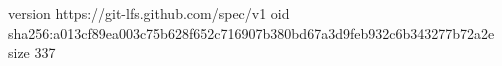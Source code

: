 version https://git-lfs.github.com/spec/v1
oid sha256:a013cf89ea003c75b628f652c716907b380bd67a3d9feb932c6b343277b72a2e
size 337
